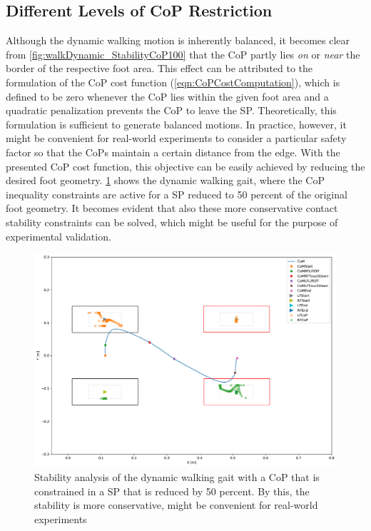 \subsection{Different Levels of CoP Restriction}
Although the dynamic walking motion is inherently balanced, it becomes clear from \cref{fig:walkDynamic_StabilityCoP100} that the \gls{CoP} partly lies \textit{on} or \textit{near} the border of the respective foot area. This effect can be attributed to the formulation of the \gls{CoP} cost function (\cref{eqn:CoPCostComputation}), which is defined to be zero whenever the \gls{CoP} lies within the given foot area and a quadratic penalization prevents the \gls{CoP} to leave the \gls{SP}. 
Theoretically, this formulation is sufficient to generate balanced motions. 
In practice, however, it might be convenient for real-world experiments to consider a particular safety factor so that the \gls{CoP}s maintain a certain distance from the edge. With the presented \gls{CoP} cost function, this objective can be easily achieved by reducing the desired foot geometry. 
\cref{fig:walkDynamic_StabilityCoP50} shows the dynamic walking gait, where the \gls{CoP} inequality constraints are active for a \gls{SP} reduced to 50 percent of the original foot geometry. It becomes evident that also these more conservative contact stability constraints can be solved, which might be useful for the purpose of experimental validation. 
\begin{figure}[h!]
\centering	
\includegraphics[width=.8\textwidth]{fig/walkDynamic/StabilityAnalysis_CoP50}
\caption[Dynamic walking stability analysis with conservative \gls{CoP} restriction]{Stability analysis of the dynamic walking gait with a \gls{CoP} that is constrained in a \gls{SP} that is reduced by 50 percent. By this, the stability is more conservative, might be convenient for real-world experiments}
\label{fig:walkDynamic_StabilityCoP50}
\end{figure}

